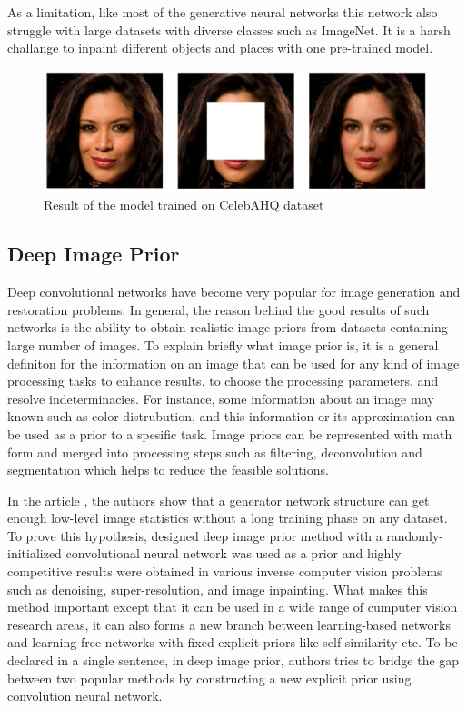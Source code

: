 As a limitation, like most of the generative neural networks this network also struggle with large datasets with diverse classes such as ImageNet. It is a harsh challange to inpaint different objects and places with one pre-trained model.

\begin{figure}[h]
    \centering
    \includegraphics[width=14cm]{figures/chapter4/gmcnnout1.png}
    \vspace*{3mm}
    \caption{Result of the model trained on CelebAHQ dataset}
    \label{fig:gmcnn_celebA}
\end{figure}

\subsection{Deep Image Prior}

Deep convolutional networks have become very popular for image generation and restoration problems. In general, the reason behind the good results of such networks is the ability to obtain realistic image priors from datasets containing large number of images. To explain briefly what image prior is, it is a general definiton for the information on an image that can be used for any kind of image processing tasks to enhance results, to choose the processing parameters, and resolve indeterminacies. For instance, some information about an image may known such as color distrubution, and this information or its approximation can be used as a prior to a spesific task. Image priors can be represented with math form and merged into processing steps such as filtering, deconvolution and segmentation which helps to reduce the feasible solutions.

In the article \cite{deep_image_prior}, the authors show that a generator network structure can get enough low-level image statistics without a long training phase on any dataset. To prove this hypothesis, designed deep image prior method with a randomly-initialized convolutional neural network was used as a prior and highly competitive results were obtained in various inverse computer vision problems such as denoising, super-resolution, and image inpainting. What makes this method important except that it can be used in a wide range of cumputer vision research areas, it can also forms a new branch between learning-based networks and learning-free networks with fixed explicit priors like self-similarity etc. To be declared in a single sentence, in deep image prior, authors tries to bridge the gap between two popular methods by constructing a new explicit prior using convolution neural network.

